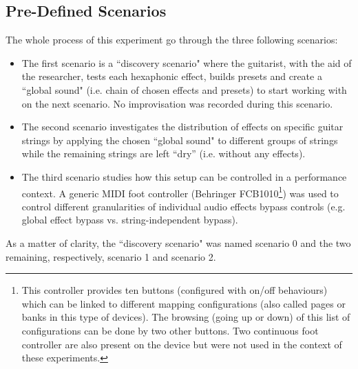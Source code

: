 \documentclass{article}
\begin{document}
\subsection{Pre-Defined Scenarios}
The whole process of this experiment go through the three following scenarios:
\begin{itemize}
    \item The first scenario is a ``discovery scenario" where the guitarist, with the aid of the researcher, tests each hexaphonic effect, builds presets and create a ``global sound" (i.e. chain of chosen effects and presets) to start working with on the next scenario. No improvisation was recorded during this scenario.  
    
    \item The second scenario investigates the distribution of effects on specific guitar strings by applying the chosen ``global sound" to different groups of strings while the remaining strings are left ``dry'' (i.e. without any effects).
    
    \item The third scenario studies how this setup can be controlled in a performance context. A generic MIDI foot controller (Behringer FCB1010\footnote{\label{foot:Behringer1010}This controller provides ten buttons (configured with on/off behaviours) which can be linked to different mapping configurations (also called pages or banks in this type of devices). The browsing (going up or down) of this list of configurations can be done by two other buttons. Two continuous foot controller are also present on the device but were not used in the context of these experiments.}) was used to control different granularities of individual audio effects bypass controls (e.g. global effect bypass vs. string-independent bypass). 
\end{itemize} 

As a matter of clarity, the ``discovery scenario" was named scenario 0 and the two remaining, respectively, scenario 1 and scenario 2.
\end{document}

